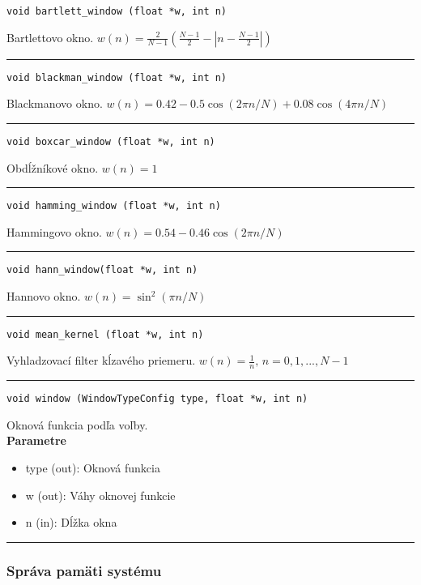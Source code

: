 \begin{lstlisting}[style=docs]
void bartlett_window (float *w, int n)
\end{lstlisting}
   Bartlettovo okno. $w(n) = \frac{2}{N - 1}\left(\frac{N - 1}{2} - \left|n - \frac{N - 1}{2} \right|\right)$
\bigbreak
\hrule

\begin{lstlisting}[style=docs]
void blackman_window (float *w, int n)
\end{lstlisting}
   Blackmanovo okno. $w(n) = 0.42 - 0.5\cos(2\pi n / N) + 0.08\cos(4\pi n / N)$
\bigbreak
\hrule

\begin{lstlisting}[style=docs]
void boxcar_window (float *w, int n)
\end{lstlisting}
   Obdĺžníkové okno.  $w(n) = 1 $
\bigbreak
\hrule

\begin{lstlisting}[style=docs]
void hamming_window (float *w, int n)
\end{lstlisting}
   Hammingovo okno.  $w(n) = 0.54 - 0.46\cos(2\pi n / N)$
\bigbreak
\hrule

\begin{lstlisting}[style=docs]
void hann_window(float *w, int n)
\end{lstlisting}
   Hannovo okno.  $w(n) = \sin^2(\pi n / N)$
\bigbreak
\hrule

\begin{lstlisting}[style=docs]
void mean_kernel (float *w, int n)
\end{lstlisting}
   Vyhladzovací filter kĺzavého priemeru.  $w(n) = \frac{1}{n},\, n = 0, 1, ..., N - 1$
\bigbreak
\hrule

\begin{lstlisting}[style=docs]
void window (WindowTypeConfig type, float *w, int n)
\end{lstlisting}
   Oknová funkcia podľa voľby. \\ 
\textbf{Parametre}
\begin{itemize}[noitemsep, topsep=0pt]
	\item type (out): Oknová funkcia
	\item w (out): Váhy oknovej funkcie
	\item n (in): Dĺžka okna  
\end{itemize}
\bigbreak
\hrule

\subsubsection*{Správa pamäti systému}

